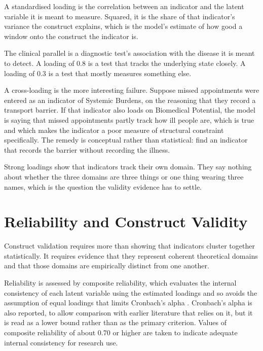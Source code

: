 \begin{reading}
A standardised loading is the correlation between an indicator and the latent
variable it is meant to measure. Squared, it is the share of that indicator's
variance the construct explains, which is the model's estimate of how good a
window onto the construct the indicator is.

The clinical parallel is a diagnostic test's association with the disease it is
meant to detect. A loading of 0.8 is a test that tracks the underlying state
closely. A loading of 0.3 is a test that mostly measures something else.

A cross-loading is the more interesting failure. Suppose missed appointments
were entered as an indicator of Systemic Burdens, on the reasoning that they
record a transport barrier. If that indicator also loads on
Biomedical Potential, the model is saying that missed appointments partly track
how ill people are, which is true and which makes the indicator a poor measure
of structural constraint specifically. The remedy is conceptual rather than
statistical: find an indicator that records the barrier without recording the
illness.
\end{reading}

Strong loadings show that indicators track their own domain. They say nothing
about whether the three domains are three things or one thing wearing three
names, which is the question the validity evidence has to settle.

\section{Reliability and Construct Validity}
\label{sec:anal-validity}
Construct validation requires more than showing that indicators cluster together statistically. It requires evidence that they represent coherent theoretical domains and that those domains are empirically distinct from one another.

Reliability is assessed by composite reliability, which evaluates the internal consistency of each latent variable using the estimated loadings and so avoids the assumption of equal loadings that limits Cronbach's alpha \citep{raykov_1997}. Cronbach's alpha is also reported, to allow comparison with earlier literature that relies on it, but it is read as a lower bound rather than as the primary criterion. Values of composite reliability of about 0.70 or higher are taken to indicate adequate internal consistency for research use.

